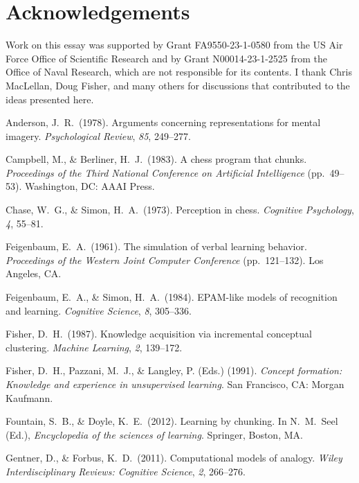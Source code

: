 \documentclass[11pt,letterpaper]{article}
\begin{document}
\vspace{-0.04in}
\section*{Acknowledgements}
\vspace{-0.01in}

Work on this essay was supported by Grant FA9550-23-1-0580 from the
US Air Force Office of Scientific Research and by Grant N00014-23-1-2525
from the Office of Naval Research, which are not responsible for its
contents. I thank Chris MacLellan, Doug Fisher, and many others for
discussions that contributed to the ideas presented here. 

\vskip 0.20in
\noindent
{}
\vskip 0.10in

{\parindent -10pt\leftskip 10pt

Anderson, J.\ R.\ (1978). Arguments concerning representations for
mental imagery. {\it Psychological Review\/}, {\it 85\/}, 249--277.

Campbell, M., \& Berliner, H.\ J.\ (1983). A chess program that chunks.
{\it Proceedings of the Third National Conference on Artificial 
Intelligence\/} (pp.\ 49--53). Washington, DC: AAAI Press. 

Chase, W.\ G., \& Simon, H.\ A.\ (1973). Perception in chess. {\it
Cognitive Psychology\/}, {\it 4\/}, 55--81.

Feigenbaum, E.\ A.\ (1961). The simulation of verbal learning behavior. 
{\it Proceedings of the Western Joint Computer Conference\/} (pp.\ 
121--132). Los Angeles, CA. 

Feigenbaum, E.\ A., \& Simon, H.\ A.\ (1984). EPAM-like models of 
recognition and learning. {\it Cognitive Science\/}, {\it 8\/},
305--336. 

Fisher, D.\ H.\ (1987). Knowledge acquisition via incremental conceptual
clustering. {\it Machine Learning\/}, {\it 2\/}, 139--172. 

Fisher, D.\ H., Pazzani, M.\ J., \& Langley, P. (Eds.) (1991). 
{\it Concept formation: Knowledge and experience in unsupervised
learning\/}. San Francisco, CA: Morgan Kaufmann.

Fountain, S.\ B., \& Doyle, K.\ E.\ (2012). Learning by chunking.
In N.\ M.\ Seel (Ed.), {\it Encyclopedia of the sciences of learning\/}. 
Springer, Boston, MA.

Gentner, D., \& Forbus, K.\ D.\ (2011). Computational models of
analogy. {\it Wiley Interdisciplinary Reviews: Cognitive Science\/},
{\it 2\/}, 266--276.

}
\end{document}
